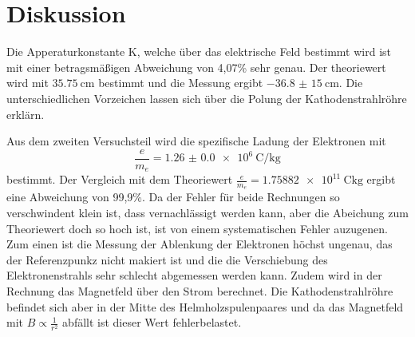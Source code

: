 \section{Diskussion}
\label{sec:Diskussion}
Die Apperaturkonstante K, welche über das elektrische Feld bestimmt wird ist mit einer
betragsmäßigen Abweichung von 4,07\% sehr genau. Der theoriewert wird mit
$\SI{35,75}{\cm}$ bestimmt und die Messung
ergibt $\SI{-36,8(15)}{\cm}$. Die unterschiedlichen Vorzeichen lassen sich über die
Polung der Kathodenstrahlröhre erklärn.

Aus dem zweiten Versuchsteil wird die spezifische Ladung der Elektronen mit
\begin{equation}
  \frac{e}{m_e}=\SI{1.26(0)e6}{\coulomb\per\kg}
\end{equation}
bestimmt. Der Vergleich mit dem Theoriewert
$\frac{e}{m_e}=\SI{1,75882e11}{\coulomb\kg}$ \cite{em}
ergibt eine Abweichung von 99,9\%.
Da der Fehler für beide Rechnungen so verschwindent klein ist, dass vernachlässigt werden
kann, aber die Abeichung zum Theoriewert doch so hoch ist, ist von einem
systematischen Fehler auzugenen. Zum einen ist die Messung der Ablenkung der Elektronen
höchst ungenau, das der Referenzpunkz nicht makiert ist und die die Verschiebung des
Elektronenstrahls sehr schlecht abgemessen werden kann. Zudem wird in der Rechnung das Magnetfeld
über den Strom berechnet. Die Kathodenstrahlröhre befindet sich aber in der Mitte des
Helmholzspulenpaares und da das Magnetfeld mit $B\propto\frac{1}{r^{2}}$ abfällt
ist dieser Wert fehlerbelastet.
